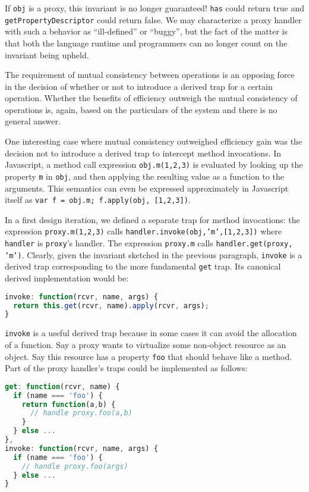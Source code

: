 \documentclass{acm_proc_article-sp}
\begin{document}
If \texttt{obj} is a proxy, this invariant is no longer guaranteed! \texttt{has} could return true and \texttt{getPropertyDescriptor} could return false. We may characterize a proxy handler with such a behavior as ``ill-defined'' or ``buggy'', but the fact of the matter is that both the language runtime and programmers can no longer count on the invariant being upheld.

The requirement of mutual consistency between operations is an opposing force in the decision of whether or not to introduce a derived trap for a certain operation. Whether the benefits of efficiency outweigh the mutual consistency of operations is, again, based on the particulars of the system and there is no general answer.

One interesting case where mutual consistency outweighed efficiency gain was the decision not to introduce a derived trap to intercept method invocations. In Javascript, a method call expression \texttt{obj.m(1,2,3)} is evaluated by looking up the property \texttt{m} in \texttt{obj}, and then applying the resulting value as a function to the arguments. This semantics can even be expressed approximately in Javascript itself as \texttt{var f = obj.m; f.apply(obj, [1,2,3])}.

In a first design iteration, we defined a separate trap for method invocations: the expression \texttt{proxy.m(1,2,3)} calls \texttt{handler.invoke(obj,'m',[1,2,3])} where \texttt{handler} is \texttt{proxy}'s handler. The expression \texttt{proxy.m} calls \texttt{handler.get(proxy, 'm')}. Clearly, given the invariant sketched in the previous paragraph, \texttt{invoke} is a derived trap corresponding to the more fundamental \texttt{get} trap. Its canonical derived implementation would be:

\begin{lstlisting}[language=javascript]
invoke: function(rcvr, name, args) {
  return this.get(rcvr, name).apply(rcvr, args);
}
\end{lstlisting}

\texttt{invoke} is a useful derived trap because in some cases it can avoid the allocation of a function. Say a proxy wants to virtualize some non-object resource as an object. Say this resource has a property \texttt{foo} that should behave like a method. Part of the proxy handler's traps could be implemented as follows:

\begin{lstlisting}[language=javascript]
get: function(rcvr, name) {
  if (name === 'foo') {
    return function(a,b) {
      // handle proxy.foo(a,b)
    } 
  } else ...
},
invoke: function(rcvr, name, args) {
  if (name === 'foo') {
    // handle proxy.foo(args)
  } else ...
}
\end{lstlisting}
\end{document}
